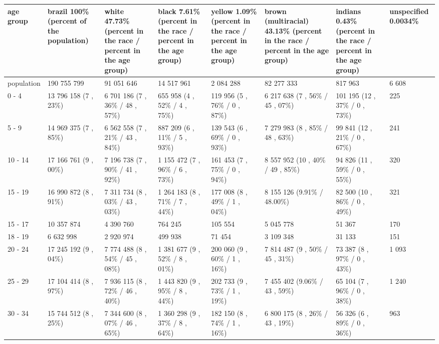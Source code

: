 \documentclass{article}
\begin{document}
\begin{tabular}{llllllll}
\toprule
age group & brazil 100\% (percent of the population) & white 47.73\% (percent in the race / percent in the age group) & black 7.61\% (percent in the race / percent in the age group) & yellow 1.09\% (percent in the race / percent in the age group) & brown (multiracial) 43.13\% (percent in the race / percent in the age group) & indians 0.43\% (percent in the race / percent in the age group) & unspecified 0.0034\% \\
\midrule
population & 190 755 799 & 91 051 646 & 14 517 961 & 2 084 288 & 82 277 333 & 817 963 & 6 608 \\
0 - 4 & 13 796 158 (7 , 23\%) & 6 701 186 (7 , 36\% / 48 , 57\%) & 655 958 (4 , 52\% / 4 , 75\%) & 119 956 (5 , 76\% / 0 , 87\%) & 6 217 638 (7 , 56\% / 45 , 07\%) & 101 195 (12 , 37\% / 0 , 73\%) & 225 \\
5 - 9 & 14 969 375 (7 , 85\%) & 6 562 558 (7 , 21\% / 43 , 84\%) & 887 209 (6 , 11\% / 5 , 93\%) & 139 543 (6 , 69\% / 0 , 93\%) & 7 279 983 (8 , 85\% / 48 , 63\%) & 99 841 (12 , 21\% / 0 , 67\%) & 241 \\
10 - 14 & 17 166 761 (9 , 00\%) & 7 196 738 (7 , 90\% / 41 , 92\%) & 1 155 472 (7 , 96\% / 6 , 73\%) & 161 453 (7 , 75\% / 0 , 94\%) & 8 557 952 (10 , 40\% / 49 , 85\%) & 94 826 (11 , 59\% / 0 , 55\%) & 320 \\
15 - 19 & 16 990 872 (8 , 91\%) & 7 311 734 (8 , 03\% / 43 , 03\%) & 1 264 183 (8 , 71\% / 7 , 44\%) & 177 008 (8 , 49\% / 1 , 04\%) & 8 155 126 (9.91\% / 48.00\%) & 82 500 (10 , 86\% / 0 , 49\%) & 321 \\
15 - 17 & 10 357 874 & 4 390 760 & 764 245 & 105 554 & 5 045 778 & 51 367 & 170 \\
18 - 19 & 6 632 998 & 2 920 974 & 499 938 & 71 454 & 3 109 348 & 31 133 & 151 \\
20 - 24 & 17 245 192 (9 , 04\%) & 7 774 488 (8 , 54\% / 45 , 08\%) & 1 381 677 (9 , 52\% / 8 , 01\%) & 200 060 (9 , 60\% / 1 , 16\%) & 7 814 487 (9 , 50\% / 45 , 31\%) & 73 387 (8 , 97\% / 0 , 43\%) & 1 093 \\
25 - 29 & 17 104 414 (8 , 97\%) & 7 936 115 (8 , 72\% / 46 , 40\%) & 1 443 820 (9 , 95\% / 8 , 44\%) & 202 733 (9 , 73\% / 1 , 19\%) & 7 455 402 (9.06\% / 43 , 59\%) & 65 104 (7 , 96\% / 0 , 38\%) & 1 240 \\
30 - 34 & 15 744 512 (8 , 25\%) & 7 344 600 (8 , 07\% / 46 , 65\%) & 1 360 298 (9 , 37\% / 8 , 64\%) & 182 150 (8 , 74\% / 1 , 16\%) & 6 800 175 (8 , 26\% / 43 , 19\%) & 56 326 (6 , 89\% / 0 , 36\%) & 963 \\

\end{tabular}
\end{document}
